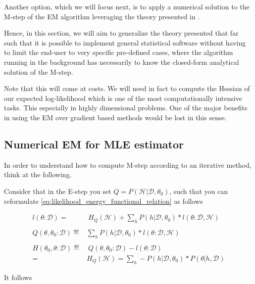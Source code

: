 \documentclass[11pt]{article}
\begin{document}
\begin{article}
Another option, which we will focus next, is to apply a numerical
solution to the M-step of the EM algorithm leveraging the theory
presented in \cite{ruud1989comparison}.

Hence, in this section, we will aim to generalize the theory
presented that far such that it is possible to implement general
statistical software without having to limit the end-user to very
specific pre-defined cases, where the algorithm running in the
background has necessarily to know the closed-form analytical
solution of the M-step.

Note that this will come at costs. We will need in fact to compute
the Hessian of our expected log-likelihood which is one of the most
computationally intensive tasks. This especially in highly
dimensional problems. One of the major benefits in using the EM over
gradient based methods would be lost in this sense.

\subsection{Numerical EM for MLE estimator}
\label{sec:org9bd71a4}

In order to understand how to compute M-step according to an
iterative method, think at the following.

Consider that in the E-step you set \(Q = P (\mathscr{H}| \mathscr{D}, \theta_0)\), such
that you can reformulate
\ref{eq:likelihood_energy_functional_relation} as follows

\begin{align} \label{eq:likelihood_energy_iterative}
l (\theta: \mathscr{D}) =& \ H_Q (\mathscr {H}) + \sum_h P(h | \mathscr{D}, \theta_0) * l (\theta: \mathscr{D}, \mathscr{H}) \\
\nonumber\\
Q(\theta, \theta_0 : \mathscr{D}) \eqdef& \sum_h P(h | \mathscr{D}, \theta_0) * l (\theta: \mathscr{D}, \mathscr{H})\\
\nonumber\\  
H(\theta_0, \theta: \mathscr{D}) \eqdef& \ Q(\theta, \theta_0 : \mathscr{D}) - l (\theta: \mathscr{D}) \\
                                 =& H_Q (\mathscr {H}) = \sum_h - P(h | \mathscr{D}, \theta_0) * P(\theta | h, \mathscr{D}) \nonumber
\end{align}

It follows


\end{article}
\end{document}
